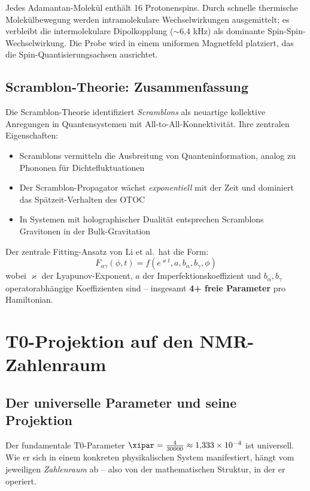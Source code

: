 Jedes Adamantan-Molekül enthält 16 Protonenspins. Durch schnelle thermische Molekülbewegung werden intramolekulare Wechselwirkungen ausgemittelt; es verbleibt die intermolekulare Dipolkopplung ($\sim$6,4 kHz) als dominante Spin-Spin-Wechselwirkung. Die Probe wird in einem uniformen Magnetfeld platziert, das die Spin-Quantisierungsachsen ausrichtet.

\subsection{Scramblon-Theorie: Zusammenfassung}

Die Scramblon-Theorie \cite{kitaev_soft_mode_2018, gu_kitaev_2019, stanford_subleading_2022} identifiziert \emph{Scramblons} als neuartige kollektive Anregungen in Quantensystemen mit All-to-All-Konnektivität. Ihre zentralen Eigenschaften:

\begin{itemize}
	\item Scramblons vermitteln die Ausbreitung von Quanteninformation, analog zu Phononen für Dichtefluktuationen
	\item Der Scramblon-Propagator wächst \emph{exponentiell} mit der Zeit und dominiert das Spätzeit-Verhalten des OTOC
	\item In Systemen mit holographischer Dualität entsprechen Scramblons Gravitonen in der Bulk-Gravitation
\end{itemize}

Der zentrale Fitting-Ansatz von Li et al.\ hat die Form:
\begin{equation}
	F_{\alpha\gamma}(\phi, t) = f\left(e^{\varkappa t}, a, b_\alpha, b_\gamma, \phi\right)
	\label{eq:scramblon_ansatz}
\end{equation}
wobei $\varkappa$ der Lyapunov-Exponent, $a$ der Imperfektionskoeffizient und $b_\alpha, b_\gamma$ operatorabhängige Koeffizienten sind -- insgesamt \textbf{4+ freie Parameter} pro Hamiltonian.


\section{T0-Projektion auf den NMR-Zahlenraum}
\label{sec:t0projection}

\subsection{Der universelle Parameter und seine Projektion}

Der fundamentale T0-Parameter $\xipar = \frac{4}{30000} \approx 1{,}333 \times 10^{-4}$ ist universell. Wie er sich in einem konkreten physikalischen System manifestiert, hängt vom jeweiligen \emph{Zahlenraum} ab -- also von der mathematischen Struktur, in der er operiert.

